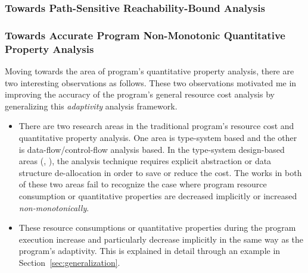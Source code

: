 \subsubsection{Towards Path-Sensitive Reachability-Bound Analysis}
\label{sec:intro-reachability}

\subsubsection{Towards Accurate Program Non-Monotonic Quantitative Property Analysis}
\label{sec:intro-cost}
Moving towards the area of program's quantitative property analysis,
there are two interesting observations as follows.
These two observations motivated me in 
improving the accuracy of the program's general resource cost analysis
by generalizing this \emph{adaptivity} analysis framework.
\begin{itemize}
 \item 
 There are two research areas in the traditional program's resource cost and quantitative property analysis.
One area is type-system based and the other is data-flow/control-flow analysis based. 
In the type-system design-based areas (\cite{GustafssonEL05}, \cite{hoffmann_jost_2022}), 
the analysis technique requires explicit abstraction or data structure de-allocation in order to save or reduce the cost.
 The
 works in both of these two areas fail to recognize the case where program resource consumption or quantitative properties 
 are decreased implicitly or increased \emph{non-monotonically}.
 \item These resource consumptions or quantitative properties during the program 
 execution increase and particularly decrease implicitly in the same way as the program's adaptivity. 
 This is explained in detail through an example in Section~\ref*{sec:generalization}.
\end{itemize}
